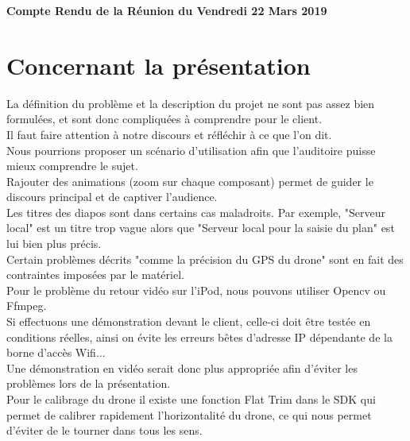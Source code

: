 \documentclass[]{article}
\begin{document}
\pagestyle{fancy}
\renewcommand\headrulewidth{1pt}
\renewcommand\footrulewidth{1pt}

\begin{center}
\large{\textbf{Compte Rendu de la Réunion du Vendredi 22 Mars 2019 \bigbreak}}
\end{center}

\section{Concernant la présentation}
La définition du problème et la description du projet ne sont pas assez bien formulées, et sont donc compliquées à comprendre pour le client.\\
Il faut faire attention à notre discours et réfléchir à ce que l'on dit.\\
Nous pourrions proposer un scénario d'utilisation afin que l'auditoire puisse mieux comprendre le sujet.\\
Rajouter des animations (zoom sur chaque composant) permet de guider le discours principal et de captiver l'audience.\\

Les titres des diapos sont dans certains cas maladroits. Par exemple, "Serveur local" est un titre trop vague alors que "Serveur local pour la saisie du plan" est lui bien plus précis.\\
Certain problèmes décrits "comme la précision du GPS du drone" sont en fait des contraintes imposées par le matériel.\\
Pour le problème du retour vidéo sur l'iPod, nous pouvons utiliser Opencv ou Ffmpeg.\\
Si effectuons une démonstration devant le client, celle-ci doit être testée en conditions réelles, ainsi on évite les erreurs bêtes d'adresse IP dépendante de la borne d'accès Wifi...\\
Une démonstration en vidéo serait donc plus appropriée afin d'éviter les problèmes lors de la présentation.\\
Pour le calibrage du drone il existe une fonction Flat Trim dans le SDK qui permet de calibrer rapidement l'horizontalité du drone, ce qui nous permet d'éviter de le tourner dans tous les sens.

 
\end{document}
